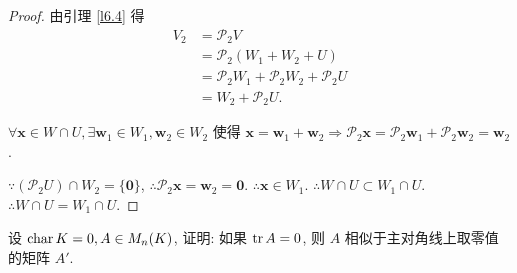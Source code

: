 \documentclass[color=black,device=normal,lang=cn,mode=geye]{elegantnote}
\begin{document}
\begin{proof}
    由引理 \ref{l6.4} 得
    \begin{align*}
        V_2 & =\mathcal{P}_2V \\
        & =\mathcal{P}_2(W_1+W_2+U) \\
        & =\mathcal{P}_2W_1+\mathcal{P}_2W_2+\mathcal{P}_2U \\
        & =W_2+\mathcal{P}_2U.
    \end{align*}

    $\forall\boldsymbol{x}\in W\cap U,\exists\boldsymbol{w}_1\in W_1,\boldsymbol{w}_2\in W_2$ 使得 $\boldsymbol{x}=\boldsymbol{w}_1+\boldsymbol{w}_2\Rightarrow\mathcal{P}_2\boldsymbol{x}=\mathcal{P}_2\boldsymbol{w}_1+\mathcal{P}_2\boldsymbol{w}_2=\boldsymbol{w}_2$.

    $\because(\mathcal{P}_2U)\cap W_2=\{\boldsymbol{0}\}$, $\therefore\mathcal{P}_2\boldsymbol{x}=\boldsymbol{w}_2=\boldsymbol{0}$. $\therefore\boldsymbol{x}\in W_1$. $\therefore W\cap U\subset W_1\cap U$. $\therefore W\cap U=W_1\cap U$.
\end{proof}
\begin{exercise}\label{ex2.11}
    设 $\operatorname{char} K=0,A\in M_n(K)$, 证明: 如果 $\operatorname{tr} A=0$, 则 $A$ 相似于主对角线上取零值的矩阵 $A'$.
\end{exercise}
\end{document}
